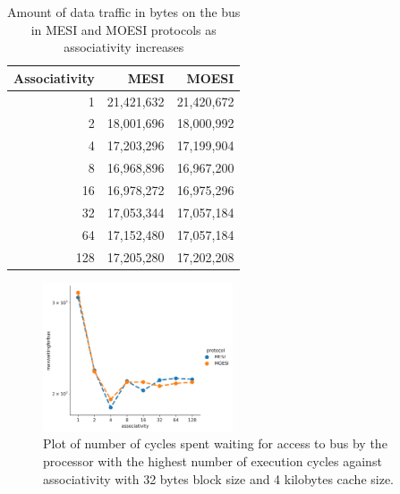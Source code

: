 \documentclass[nonacm,acmsmall,screen,11pt]{acmart}
\begin{document}
\begin{table}[htb!]
  \centering
  \caption{Amount of data traffic in bytes on the bus in MESI and MOESI protocols as associativity increases}
  \label{tab:datatraffic}
  \begin{tabular}{r|r|r}
    \textbf{Associativity} & \textbf{MESI} & \textbf{MOESI} \\ \hline
    1                      & 21,421,632    & 21,420,672     \\
    2                      & 18,001,696    & 18,000,992     \\
    4                      & 17,203,296    & 17,199,904     \\
    8                      & 16,968,896    & 16,967,200     \\
    16                     & 16,978,272    & 16,975,296     \\
    32                     & 17,053,344    & 17,057,184     \\
    64                     & 17,152,480    & 17,057,184     \\
    128                    & 17,205,280    & 17,202,208     \\
  \end{tabular}
\end{table}

\begin{figure}[htb!]
  \centering
  \includegraphics[width=0.5\textwidth]{maxwaitingforbus}
  \caption{Plot of number of cycles spent waiting for access to bus by the processor with the highest number of execution cycles against associativity with 32 bytes block size and 4 kilobytes cache size.}
  \label{fig:maxwaitingforbus}
\end{figure}
\end{document}
